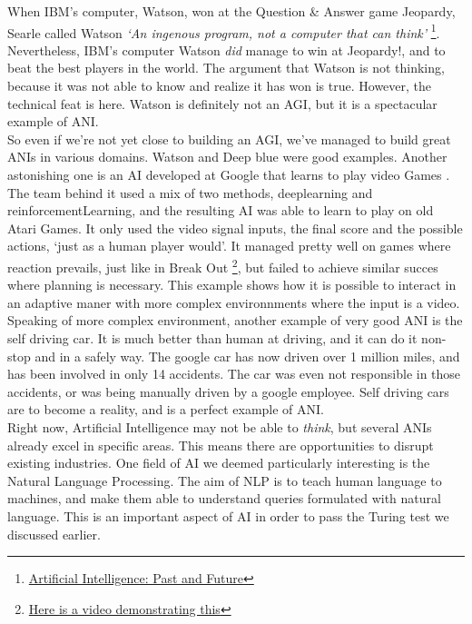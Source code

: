 \documentclass[12pt]{article}
\begin{document}
When IBM's computer, Watson, won at the Question \& Answer game Jeopardy, Searle
called Watson \textit{\lq  An ingenous program, not a computer that can
think\rq} \footnote{
\href{http://cacm.acm.org/magazines/2012/1/144824-artificial-intelligence-past-and-future/fulltext}
{Artificial Intelligence: Past and Future}}. Nevertheless, IBM's computer Watson
{\em did} manage to win at Jeopardy!, and to beat the best players in the world.
The argument that Watson is not thinking, because it was not able to know and
realize it has won is true. However, the technical feat is here. Watson is
definitely not an \gls{AGI}, but it is a spectacular example of \gls{ANI}. \\

So even if we're not yet close to building an \gls{AGI}, we've managed to build
great \gls{ANI}s in various domains. Watson and Deep blue were good examples.
Another astonishing one is an AI developed at Google that learns to play video
Games \cite{Atari}. The team behind it used a mix of two methods, \gls{deeplearning}
and \gls{reinforcementLearning}, and the resulting AI was able to learn to play on
old Atari Games. It only used the video signal inputs, the final score and the
possible actions, \lq just as a human player would\rq. It managed pretty well on
games where reaction prevails, just like in Break Out
\footnote{\href{https://www.youtube.com/watch?v=cjpEIotvwFY} {Here is a video
demonstrating this}}, but failed to achieve similar succes where planning is
necessary. This example shows how it is possible to interact in an adaptive
maner with more complex environnments where the input is a video. \\

Speaking of more complex environment, another example of very good \gls{ANI} is
the self driving car. It is much better than human at driving, and it can do it
non-stop and in a safely way. The google car has now driven over 1 million
miles, and has been involved in only 14 accidents. The car was even not
responsible in those accidents, or was being manually driven by a google
employee. Self driving cars are to become a reality, and is a perfect example of
\gls{ANI}. \\

Right now, Artificial Intelligence may not be able to {\em think}, but several
ANIs already excel in specific areas. This means there are opportunities to
disrupt existing industries. One field of AI we deemed particularly interesting
is the Natural Language Processing. The aim of NLP is to teach human language to
machines, and make them able to understand queries formulated with natural
language. This is an important aspect of AI in order to pass the Turing test we
discussed earlier. \\
\end{document}
